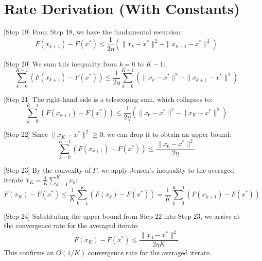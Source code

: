 \documentclass{article}
\begin{document}
\section*{Rate Derivation (With Constants)}
[Step 19] From Step 18, we have the fundamental recursion:
\begin{equation}
F(x_{k+1}) - F(x^*) \leq \frac{1}{2\eta} \left( \|x_k - x^*\|^2 - \|x_{k+1} - x^*\|^2 \right)
\end{equation}

[Step 20] We sum this inequality from $k = 0$ to $K-1$:
\begin{equation}
\sum_{k=0}^{K-1} \left( F(x_{k+1}) - F(x^*) \right) \leq \frac{1}{2\eta} \sum_{k=0}^{K-1} \left( \|x_k - x^*\|^2 - \|x_{k+1} - x^*\|^2 \right)
\end{equation}

[Step 21] The right-hand side is a telescoping sum, which collapses to:
\begin{equation}
\sum_{k=0}^{K-1} \left( F(x_{k+1}) - F(x^*) \right) \leq \frac{1}{2\eta} \left( \|x_0 - x^*\|^2 - \|x_K - x^*\|^2 \right)
\end{equation}

[Step 22] Since $\|x_K - x^*\|^2 \geq 0$, we can drop it to obtain an upper bound:
\begin{equation}
\sum_{k=0}^{K-1} \left( F(x_{k+1}) - F(x^*) \right) \leq \frac{\|x_0 - x^*\|^2}{2\eta}
\end{equation}

[Step 23] By the convexity of $F$, we apply Jensen's inequality to the averaged iterate $\bar{x}_K = \frac{1}{K}\sum_{k=1}^K x_k$:
\begin{equation}
F(\bar{x}_K) - F(x^*) \leq \frac{1}{K} \sum_{k=1}^K \left( F(x_k) - F(x^*) \right) = \frac{1}{K} \sum_{k=0}^{K-1} \left( F(x_{k+1}) - F(x^*) \right)
\end{equation}

[Step 24] Substituting the upper bound from Step 22 into Step 23, we arrive at the convergence rate for the averaged iterate:
\begin{equation}
F(\bar{x}_K) - F(x^*) \leq \frac{\|x_0 - x^*\|^2}{2 \eta K}
\end{equation}
This confirms an $O(1/K)$ convergence rate for the averaged iterate.
\end{document}
